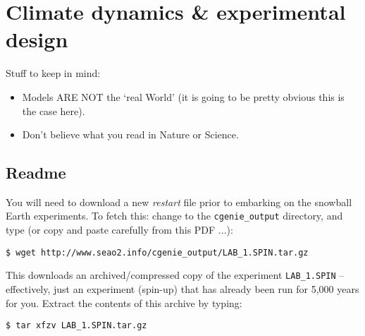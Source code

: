 \documentclass[11pt,fleqn]{book} %
\begin{document}

\cleardoublepage


\chapter{Climate dynamics \& experimental design}

\hfill \break

\noindent Stuff to keep in mind:

\begin{itemize}
\vspace{1mm}
\item Models ARE NOT the ‘real World’ (it is going to be pretty obvious this is the case here).
\vspace{1mm}
\item Don’t believe what you read in Nature or Science.
\end{itemize}


\newpage


\section*{Readme}

You will need to download a new \textit{restart} file prior to embarking on the snowball Earth experiments.
To fetch this: change to the \texttt{cgenie\_output} directory, and type (or copy and paste carefully from this PDF ...):
\vspace{-2mm}
\begin{verbatim}
$ wget http://www.seao2.info/cgenie_output/LAB_1.SPIN.tar.gz
\end{verbatim}
\vspace{-2mm}

This downloads an archived/compressed copy of the experiment \texttt{LAB\_1.SPIN} – effectively, just an experiment (spin-up) that has already been run for 5,000 years for you. Extract the contents of this archive by typing:
\vspace{-2mm}
\begin{verbatim}
$ tar xfzv LAB_1.SPIN.tar.gz
\end{verbatim}
\vspace{-2mm}
\end{document}
